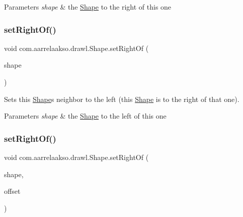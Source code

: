 \begin{DoxyParams}{Parameters}
{\em shape} & the \hyperlink{classcom_1_1aarrelaakso_1_1drawl_1_1_shape}{Shape} to the right of this one \\
\hline
\end{DoxyParams}
\mbox{\label{classcom_1_1aarrelaakso_1_1drawl_1_1_shape_a3cada5e03bd1552a79702d2945c7ed01}} 
\subsubsection{\texorpdfstring{set\+Right\+Of()}{setRightOf()}\hspace{0.1cm}{\footnotesize\ttfamily [1/2]}}
{\footnotesize\ttfamily void com.\+aarrelaakso.\+drawl.\+Shape.\+set\+Right\+Of (\begin{DoxyParamCaption}\item[{@Not\+Null final \hyperlink{classcom_1_1aarrelaakso_1_1drawl_1_1_shape}{Shape}}]{shape }\end{DoxyParamCaption})}



Sets this \hyperlink{classcom_1_1aarrelaakso_1_1drawl_1_1_shape}{Shape}\textquotesingle{}s neighbor to the left (this \hyperlink{classcom_1_1aarrelaakso_1_1drawl_1_1_shape}{Shape} is to the right of that one). 


\begin{DoxyParams}{Parameters}
{\em shape} & the \hyperlink{classcom_1_1aarrelaakso_1_1drawl_1_1_shape}{Shape} to the left of this one \\
\hline
\end{DoxyParams}
\mbox{\label{classcom_1_1aarrelaakso_1_1drawl_1_1_shape_a89e85848d24dca0fa60ff68d169eef11}} 
\subsubsection{\texorpdfstring{set\+Right\+Of()}{setRightOf()}\hspace{0.1cm}{\footnotesize\ttfamily [2/2]}}
{\footnotesize\ttfamily void com.\+aarrelaakso.\+drawl.\+Shape.\+set\+Right\+Of (\begin{DoxyParamCaption}\item[{@Not\+Null final \hyperlink{classcom_1_1aarrelaakso_1_1drawl_1_1_shape}{Shape}}]{shape,  }\item[{@Not\+Null final \hyperlink{classcom_1_1aarrelaakso_1_1drawl_1_1_measure}{Measure}}]{offset }\end{DoxyParamCaption})}



